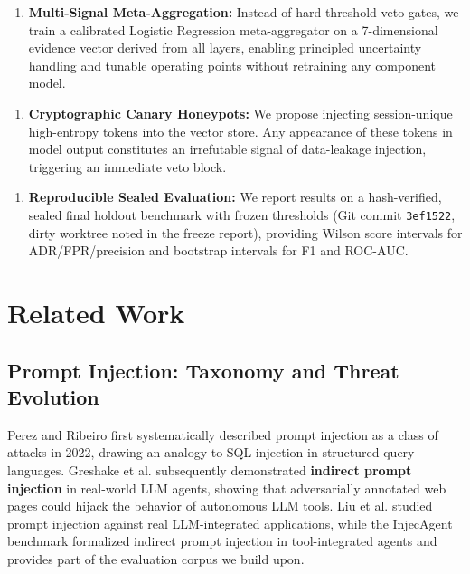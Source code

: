 \documentclass[conference]{IEEEtran}
\begin{document}
\begin{enumerate}
\item \textbf{Multi-Signal Meta-Aggregation:} Instead of hard-threshold veto gates, we train a calibrated Logistic Regression meta-aggregator on a 7-dimensional evidence vector derived from all layers, enabling principled uncertainty handling and tunable operating points without retraining any component model.
\end{enumerate}

\begin{enumerate}
\item \textbf{Cryptographic Canary Honeypots:} We propose injecting session-unique high-entropy tokens into the vector store. Any appearance of these tokens in model output constitutes an irrefutable signal of data-leakage injection, triggering an immediate veto block.
\end{enumerate}

\begin{enumerate}
\item \textbf{Reproducible Sealed Evaluation:} We report results on a hash-verified, sealed final holdout benchmark with frozen thresholds (Git commit \texttt{3ef1522}, dirty worktree noted in the freeze report), providing Wilson score intervals for ADR/FPR/precision and bootstrap intervals for F1 and ROC-AUC.
\end{enumerate}


\section{Related Work}

\subsection{Prompt Injection: Taxonomy and Threat Evolution}

Perez and Ribeiro \cite{ref1} first systematically described prompt injection as a class of attacks in 2022, drawing an analogy to SQL injection in structured query languages. Greshake et al. \cite{ref2} subsequently demonstrated \textbf{indirect prompt injection} in real-world LLM agents, showing that adversarially annotated web pages could hijack the behavior of autonomous LLM tools. Liu et al. \cite{ref3} studied prompt injection against real LLM-integrated applications, while the InjecAgent benchmark \cite{ref4} formalized indirect prompt injection in tool-integrated agents and provides part of the evaluation corpus we build upon.
\end{document}
